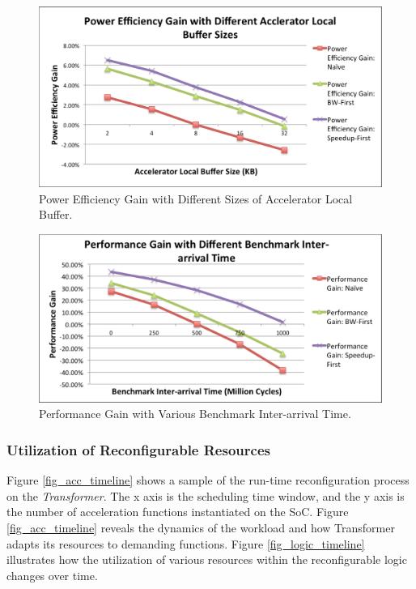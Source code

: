 \begin{figure}
    \centering
    \includegraphics[width=4.5in]{Acc-Buffer-Power}
    \caption{Power Efficiency Gain with Different Sizes of Accelerator Local Buffer.}
    \label{fig_acc_buffer_power}
\end{figure}

\begin{figure}
    \centering
    \includegraphics[width=4.5in]{Benchmark-Switching-Time}
    \caption{Performance Gain with Various Benchmark Inter-arrival Time.}
    \label{fig_benchmark-switching}
\end{figure}

\subsubsection{Utilization of Reconfigurable Resources}

Figure \ref{fig_acc_timeline} shows a sample of the run-time
reconfiguration process on the {\em Transformer}. The x axis is the
scheduling time window, and the y axis is the number of acceleration
functions instantiated on the SoC. Figure \ref{fig_acc_timeline}
reveals the dynamics of the workload and how {Transformer} adapts its
resources to demanding functions. Figure \ref{fig_logic_timeline}
illustrates how the utilization of various resources within the
reconfigurable logic changes over time.

